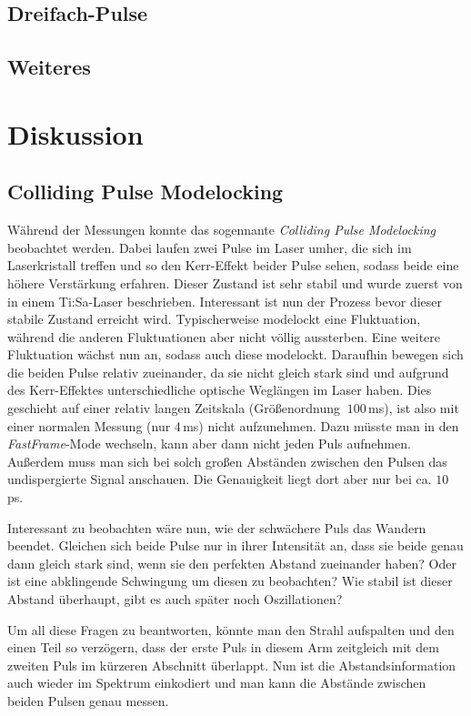 \documentclass[bachelor,       %
               twoside,        %
               BCOR10mm,       %
               english,ngerman, %
               ]{GAUBM}
\begin{document}
\section{Dreifach-Pulse}

\section{Weiteres}

\chapter{Diskussion}
\section{Colliding Pulse Modelocking}
Während der Messungen konnte das sogennante \textit{Colliding Pulse Modelocking} beobachtet werden.
Dabei laufen zwei Pulse im Laser umher, die sich im Laserkristall treffen und so den Kerr-Effekt beider Pulse sehen, sodass beide eine höhere Verstärkung erfahren.
Dieser Zustand ist sehr stabil und wurde zuerst von \cite{lai_multiple_1997} in einem Ti:Sa-Laser beschrieben.
Interessant ist nun der Prozess bevor dieser stabile Zustand erreicht wird.
Typischerweise modelockt eine Fluktuation, während die anderen Fluktuationen aber nicht völlig aussterben.
Eine weitere Fluktuation wächst nun an, sodass auch diese modelockt.
Daraufhin bewegen sich die beiden Pulse relativ zueinander, da sie nicht gleich stark sind und aufgrund des Kerr-Effektes unterschiedliche optische Weglängen im Laser haben.
Dies geschieht auf einer relativ langen Zeitskala (Größenordnung $~100\,$ms), ist also mit einer normalen Messung (nur 4\,ms) nicht aufzunehmen.
Dazu müsste man in den \textit{FastFrame}-Mode wechseln, kann aber dann nicht jeden Puls aufnehmen.
Außerdem muss man sich bei solch großen Abständen zwischen den Pulsen das undispergierte Signal anschauen.
Die Genauigkeit liegt dort aber nur bei ca. $10\,$ps.

Interessant zu beobachten wäre nun, wie der schwächere Puls das Wandern beendet.
Gleichen sich beide Pulse nur in ihrer Intensität an, dass sie beide genau dann gleich stark sind, wenn sie den perfekten Abstand zueinander haben?
Oder ist eine abklingende Schwingung um diesen zu beobachten?
Wie stabil ist dieser Abstand überhaupt, gibt es auch später noch Oszillationen?

Um all diese Fragen zu beantworten, könnte man den Strahl aufspalten und den einen Teil so verzögern, dass der erste Puls in diesem Arm zeitgleich mit dem zweiten Puls im kürzeren Abschnitt überlappt.
Nun ist die Abstandsinformation auch wieder im Spektrum einkodiert und man kann die Abstände zwischen beiden Pulsen genau messen.
\end{document}

